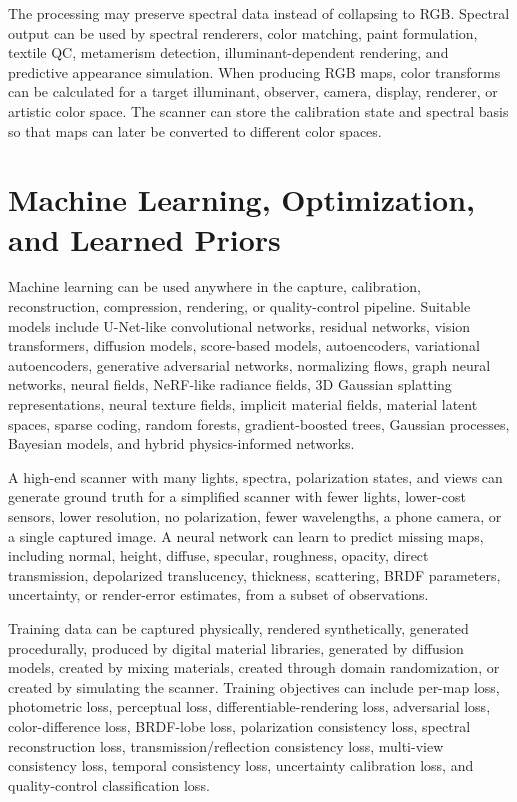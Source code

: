 \documentclass[11pt, twoside, listof=totocnumbered, bibliography=totocnumbered]{scrartcl}
\begin{document}
	The processing may preserve spectral data instead of collapsing to RGB. Spectral output can be used by spectral renderers, color matching, paint formulation, textile QC, metamerism detection, illuminant-dependent rendering, and predictive appearance simulation. When producing RGB maps, color transforms can be calculated for a target illuminant, observer, camera, display, renderer, or artistic color space. The scanner can store the calibration state and spectral basis so that maps can later be converted to different color spaces.
	
	\section{Machine Learning, Optimization, and Learned Priors}
	Machine learning can be used anywhere in the capture, calibration, reconstruction, compression, rendering, or quality-control pipeline. Suitable models include U-Net-like convolutional networks, residual networks, vision transformers, diffusion models, score-based models, autoencoders, variational autoencoders, generative adversarial networks, normalizing flows, graph neural networks, neural fields, NeRF-like radiance fields, 3D Gaussian splatting representations, neural texture fields, implicit material fields, material latent spaces, sparse coding, random forests, gradient-boosted trees, Gaussian processes, Bayesian models, and hybrid physics-informed networks. \cite{DESCHAINTRE2018,GAO2019,KERBL2023,MILDENHALL2020}
	
	A high-end scanner with many lights, spectra, polarization states, and views can generate ground truth for a simplified scanner with fewer lights, lower-cost sensors, lower resolution, no polarization, fewer wavelengths, a phone camera, or a single captured image. A neural network can learn to predict missing maps, including normal, height, diffuse, specular, roughness, opacity, direct transmission, depolarized translucency, thickness, scattering, BRDF parameters, uncertainty, or render-error estimates, from a subset of observations.
	
	Training data can be captured physically, rendered synthetically, generated procedurally, produced by digital material libraries, generated by diffusion models, created by mixing materials, created through domain randomization, or created by simulating the scanner. Training objectives can include per-map loss, photometric loss, perceptual loss, differentiable-rendering loss, adversarial loss, color-difference loss, BRDF-lobe loss, polarization consistency loss, spectral reconstruction loss, transmission/reflection consistency loss, multi-view consistency loss, temporal consistency loss, uncertainty calibration loss, and quality-control classification loss.
	
\end{document}
